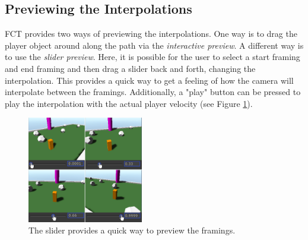 \subsection{Previewing the Interpolations}
FCT provides two ways of previewing the interpolations. One way is to drag the player object around along the path via the \textit{interactive preview}. A different way is to use the \textit{slider preview}. Here, it is possible for the user to select a start framing and end framing and then drag a slider back and forth, changing the interpolation. This provides a quick way to get a feeling of how the camera will interpolate between the framings. Additionally, a "play" button can be pressed to play the interpolation with the actual player velocity (see Figure \ref{fig:slider}).




\begin{figure}[htbp]
\centering
\includegraphics[width=0.45\textwidth]{Pics/slider}
\caption{The slider provides a quick way to preview the framings.}
\label{fig:slider}
\end{figure}

